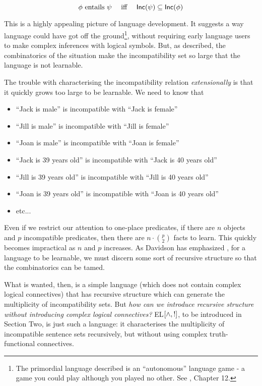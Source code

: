 \[
   \phi \mbox{ entails } \psi \quad \mbox{ iff }\quad \mathsf{Inc}(\psi) \subseteq \mathsf{Inc}(\phi)
\]

\NI This is a highly appealing picture of language development.  It
suggests a way language could have got off the ground\footnote{The
  primordial language described is an ``autonomous'' language game - a
  game you could play although you played no other. See
  \cite{brandom3}, Chapter 12.}, without requiring early language
users to make complex inferences with logical symbols.  But, as
described, the combinatorics of the situation make the incompatibility
set so large that the language is not learnable.

The trouble with characterising the incompatibility relation
\emph{extensionally} is that it quickly grows too large to be
learnable. We need to know that

\begin{itemize}

\item ``Jack is male'' is incompatible with ``Jack is female''
\item ``Jill is male'' is incompatible with ``Jill is female''
\item ``Joan is male'' is incompatible with ``Joan is female''
\item ``Jack is 39 years old'' is incompatible with ``Jack is 40 years old''
\item ``Jill is 39 years old'' is incompatible with ``Jill is 40 years old''
\item ``Joan is 39 years old'' is incompatible with ``Joan is 40 years old''
\item etc...

\end{itemize}

\NI Even if we restrict our attention to one-place predicates, if
there are $n$ objects and $p$ incompatible predicates, then there are
$n\cdot{p \choose 2}$ facts to learn.  This quickly becomes impractical as $n$ and
$p$ increases.  As Davidson has emphasized \cite{davidson}, for a
language to be learnable, we must discern some sort of recursive
structure so that the combinatorics can be tamed.

What is wanted, then, is a simple language (which does not contain
complex logical connectives) that has recursive structure which can
generate the multiplicity of incompatibility sets.  But \emph{how can
  we introduce recursive structure without introducing complex logical
  connectives?} EL$[\land, !]$, to be introduced in Section Two, is
just such a language: it characterises the multiplicity of
incompatible sentence sets recursively, but without using complex
truth-functional connectives.

